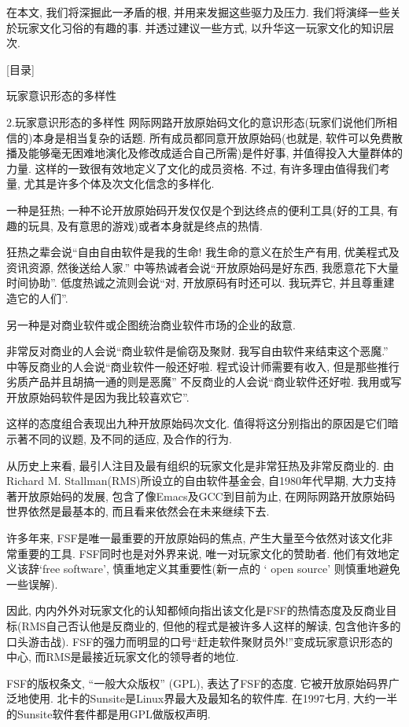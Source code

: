 \documentclass[a4paper,12pt,UTF8,twoside]{ctexbook}
\begin{document}
在本文, 我们将深掘此一矛盾的根, 并用来发掘这些驱力及压力. 我们将演绎一些关於玩家文化习俗的有趣的事.  并透过建议一些方式, 以升华这一玩家文化的知识层次.


[目录]

玩家意识形态的多样性

2.玩家意识形态的多样性
网际网路开放原始码文化的意识形态(玩家们说他们所相信的)本身是相当复杂的话题. 所有成员都同意开放原始码(也就是, 软件可以免费散播及能够毫无困难地演化及修改成适合自己所需)是件好事, 并值得投入大量群体的力量. 这样的一致很有效地定义了文化的成员资格.  不过, 有许多理由值得我们考量, 尤其是许多个体及次文化信念的多样化.

一种是狂热; 一种不论开放原始码开发仅仅是个到达终点的便利工具(好的工具, 有趣的玩具, 及有意思的游戏)或者本身就是终点的热情.

狂热之辈会说``自由自由软件是我的生命! 我生命的意义在於生产有用, 优美程式及资讯资源, 然後送给人家.'' 中等热诚者会说``开放原始码是好东西, 我愿意花下大量时间协助''. 低度热诚之流则会说``对, 开放原码有时还可以. 我玩弄它, 并且尊重建造它的人们''.

另一种是对商业软件或企图统治商业软件市场的企业的敌意.

非常反对商业的人会说``商业软件是偷窃及聚财. 我写自由软件来结束这个恶魔.'' 中等反商业的人会说``商业软件一般还好啦.  程式设计师需要有收入, 但是那些推行劣质产品并且胡搞一通的则是恶魔'' 不反商业的人会说``商业软件还好啦.  我用或写开放原始码软件是因为我比较喜欢它''.

这样的态度组合表现出九种开放原始码次文化. 值得将这分别指出的原因是它们暗示著不同的议题, 及不同的适应, 及合作的行为.

从历史上来看, 最引人注目及最有组织的玩家文化是非常狂热及非常反商业的. 由Richard M. Stallman(RMS)所设立的自由软件基金会, 自1980年代早期, 大力支持著开放原始码的发展, 包含了像Emacs及GCC到目前为止, 在网际网路开放原始码世界依然是最基本的, 而且看来依然会在未来继续下去.

许多年来, FSF是唯一最重要的开放原始码的焦点, 产生大量至今依然对该文化非常重要的工具. FSF同时也是对外界来说, 唯一对玩家文化的赞助者.  他们有效地定义该辞`free software', 慎重地定义其重要性(新一点的 ` open source' 则慎重地避免一些误解).

因此, 内内外外对玩家文化的认知都倾向指出该文化是FSF的热情态度及反商业目标(RMS自己否认他是反商业的, 但他的程式是被许多人这样的解读, 包含他许多的口头游击战). FSF的强力而明显的口号``赶走软件聚财员外!''变成玩家意识形态的中心, 而RMS是最接近玩家文化的领导者的地位.

FSF的版权条文, ``一般大众版权'' (GPL), 表达了FSF的态度. 它被开放原始码界广泛地使用. 北卡的Sunsite是Linux界最大及最知名的软件库. 在1997七月, 大约一半的Sunsite软件套件都是用GPL做版权声明.
\end{document}
